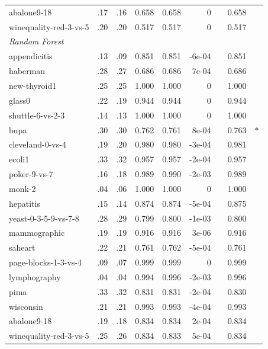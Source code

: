 \begin{tabular}{l@{\hspace{3pt}}r@{\hspace{3pt}}r@{\hspace{3pt}}r@{\hspace{3pt}}r@{\hspace{3pt}}r@{\hspace{3pt}}c@{\hspace{3pt}}r@{\hspace{3pt}}c}
abalone9-18 & .17 & .16 & 0.658 & 0.658 & 0 &  & 0.658 &  \\
winequality-red-3-vs-5 & .20 & .20 & 0.517 & 0.517 & 0 &  & 0.517 &  \\
\midrule
\multicolumn{9}{l}{\emph{Random Forest}} \\
appendicitis & .13 & .09 & 0.851 & 0.851 & -6e-04 &  & 0.851 &  \\
haberman & .28 & .27 & 0.686 & 0.686 &  7e-04 &  & 0.686 &  \\
new-thyroid1 & .25 & .25 & 1.000 & 1.000 & 0 &  & 1.000 &  \\
glass0 & .22 & .19 & 0.944 & 0.944 & 0 &  & 0.944 &  \\
shuttle-6-vs-2-3 & .14 & .13 & 1.000 & 1.000 & 0 &  & 1.000 &  \\
bupa & .30 & .30 & 0.762 & 0.761 &  8e-04 &  & 0.763 & $\ast$ \\
cleveland-0-vs-4 & .19 & .20 & 0.980 & 0.980 & -3e-04 &  & 0.981 &  \\
ecoli1 & .33 & .32 & 0.957 & 0.957 & -2e-04 &  & 0.957 &  \\
poker-9-vs-7 & .16 & .18 & 0.989 & 0.990 & -2e-03 &  & 0.989 &  \\
monk-2 & .04 & .06 & 1.000 & 1.000 & 0 &  & 1.000 &  \\
hepatitis & .15 & .14 & 0.874 & 0.874 & -5e-04 &  & 0.875 &  \\
yeast-0-3-5-9-vs-7-8 & .28 & .29 & 0.799 & 0.800 & -1e-03 &  & 0.800 &  \\
mammographic & .19 & .19 & 0.916 & 0.916 &  3e-06 &  & 0.916 &  \\
saheart & .22 & .21 & 0.761 & 0.762 & -5e-04 &  & 0.761 &  \\
page-blocks-1-3-vs-4 & .09 & .07 & 0.999 & 0.999 & 0 &  & 0.999 &  \\
lymphography & .04 & .04 & 0.994 & 0.996 & -2e-03 &  & 0.996 &  \\
pima & .33 & .32 & 0.831 & 0.831 & -2e-04 &  & 0.830 &  \\
wisconsin & .21 & .21 & 0.993 & 0.993 & -4e-04 &  & 0.993 &  \\
abalone9-18 & .19 & .18 & 0.834 & 0.834 &  2e-04 &  & 0.834 &  \\
winequality-red-3-vs-5 & .25 & .26 & 0.834 & 0.833 &  5e-04 &  & 0.834 &  \\
\bottomrule
\end{tabular}
